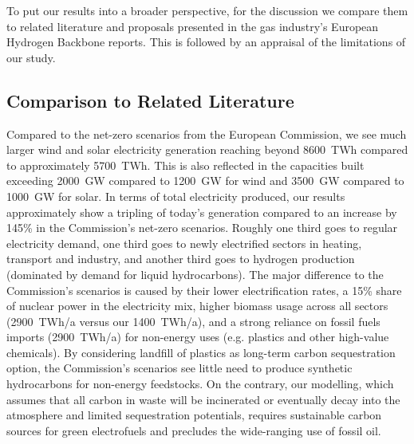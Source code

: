To put our results into a broader perspective, for the discussion we compare
them to related literature and proposals presented in the gas industry's
European Hydrogen Backbone reports. This is followed by an appraisal of the
limitations of our study.

\subsection*{Comparison to Related Literature}

Compared to the net-zero scenarios from the European
Commission,\cite{in-depth_2018} we see much larger wind and solar electricity
generation reaching beyond 8600~TWh compared to approximately 5700~TWh. This is
also reflected in the capacities built exceeding 2000~GW compared to 1200~GW for
wind and 3500~GW compared to 1000~GW for solar.\cite{in-depth_2018} In terms of
total electricity produced, our results approximately show a tripling of today's
generation compared to an increase by 145\% in the Commission's net-zero
scenarios.\cite{in-depth_2018} Roughly one third goes to regular electricity
demand, one third goes to newly electrified sectors in heating, transport and
industry, and another third goes to hydrogen production (dominated by demand for
liquid hydrocarbons). The major difference to the Commission's
scenarios\cite{in-depth_2018} is caused by their lower electrification rates, a
15\% share of nuclear power in the electricity mix, higher biomass usage across
all sectors (2900~TWh/a versus our 1400~TWh/a), and a strong reliance on fossil
fuels imports (2900~TWh/a) for non-energy uses (e.g. plastics and other
high-value chemicals). By considering landfill of plastics as long-term carbon
sequestration option, the Commission's scenarios see little need to produce
synthetic hydrocarbons for non-energy feedstocks. On the contrary, our
modelling, which assumes that all carbon in waste will be incinerated or
eventually decay into the atmosphere and limited sequestration potentials,
requires sustainable carbon sources for green electrofuels and precludes the
wide-ranging use of fossil oil.


